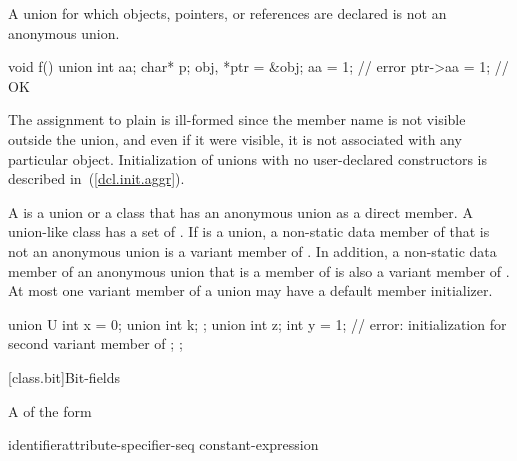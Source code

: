 \pnum
A union for which objects, pointers, or references are declared is not an anonymous union.
\enterexample

\begin{codeblock}
void f() {
  union { int aa; char* p; } obj, *ptr = &obj;
  aa = 1;                         // error
  ptr->aa = 1;                    // OK
}
\end{codeblock}

The assignment to plain  is ill-formed since the member name
is not visible outside the union, and even if it were visible, it is not
associated with any particular object.
\exitexample
\enternote
Initialization of unions with no user-declared constructors is described
in~(\ref{dcl.init.aggr}).
\exitnote

\pnum
{}%
%
A  is a union or a class that has an anonymous union as a direct
member. A union-like class  has a set of .
If  is a union, a non-static data member of  that is not an anonymous
union is a variant member of . In addition, a non-static data member of an
anonymous union that is a member of  is also a variant member of .
At most one variant member of a union may have a default member initializer.
\enterexample

\begin{codeblock}
union U {
  int x = 0;
  union {
    int k;
  };
  union {
    int z;
    int y = 1; // error: initialization for second variant member of 
  };
};
\end{codeblock}

\exitexample

[class.bit]{Bit-fields}%

\pnum
A  of the form

\begin{ncbnftab}
identifier\opt  attribute-specifier-seq\opt \terminal{:} constant-expression
\end{ncbnftab}

